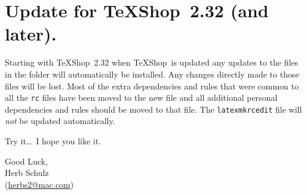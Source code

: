 \documentclass[11pt]{article}
\newcommand{\TS}{\textsf{\TeX Shop}}
\begin{document}
\section{Update for \TS\ 2.32 (and later).}

Starting with \TS\ 2.32 when \TS\ is updated any updates to the files in the  folder will automatically be installed. Any changes directly made to those files will be lost. Most of the extra dependencies and rules that were common to all the \texttt{rc} files have been moved to the new  file and all additional personal dependencies and rules should be moved to that file. The \texttt{latexmkrcedit} file will \emph{not} be updated automatically.


\vspace{5pt plus 2pt minus 1pt}\noindent
Try it\dots\ I hope you like it.

\vspace{5pt plus 2pt minus 1pt}\noindent
Good Luck,\\
Herb Schulz\\
(\href{mailto:herbs2@mac.com}{herbs2@mac.com})
\end{document}
